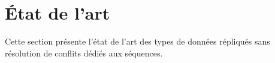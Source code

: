
\section{État de l'art}

Cette section présente l'état de l'art des types de données répliqués sans
résolution de conflits dédiés aux séquences.